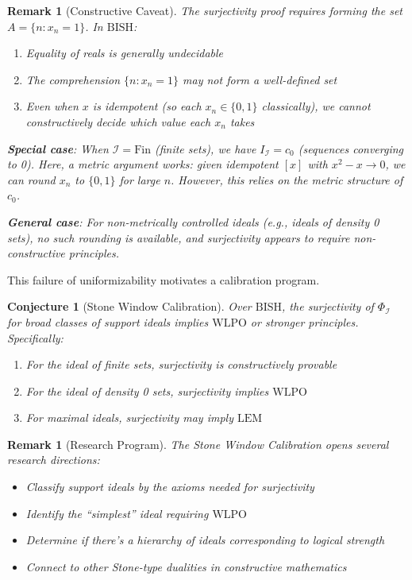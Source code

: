 \documentclass[11pt]{article}
\newtheorem{conjecture}[theorem]{Conjecture}
\newtheorem{remark}[theorem]{Remark}
\newcommand{\WLPO}{\mathrm{WLPO}}
\newcommand{\LEM}{\mathrm{LEM}}
\newcommand{\BISH}{\mathrm{BISH}}
\begin{document}
\begin{remark}[Constructive Caveat]\label{rem:constructive-caveat}
The surjectivity proof requires forming the set $A = \{n : x_n = 1\}$. In $\BISH$:
\begin{enumerate}
\item Equality of reals is generally undecidable
\item The comprehension $\{n : x_n = 1\}$ may not form a well-defined set
\item Even when $x$ is idempotent (so each $x_n \in \{0,1\}$ classically), we cannot constructively decide which value each $x_n$ takes
\end{enumerate}

\textbf{Special case}: When $\mathcal{I} = \text{Fin}$ (finite sets), we have $I_{\mathcal{I}} = c_0$ (sequences converging to 0). Here, a metric argument works: given idempotent $[x]$ with $x^2 - x \to 0$, we can round $x_n$ to $\{0,1\}$ for large $n$. However, this relies on the metric structure of $c_0$.

\textbf{General case}: For non-metrically controlled ideals (e.g., ideals of density 0 sets), no such rounding is available, and surjectivity appears to require non-constructive principles.
\end{remark}

This failure of uniformizability motivates a calibration program.

\begin{conjecture}[Stone Window Calibration]\label{conj:stone-calibration}
Over $\BISH$, the surjectivity of $\Phi_{\mathcal{I}}$ for broad classes of support ideals implies $\WLPO$ or stronger principles. Specifically:
\begin{enumerate}
\item For the ideal of finite sets, surjectivity is constructively provable
\item For the ideal of density 0 sets, surjectivity implies $\WLPO$
\item For maximal ideals, surjectivity may imply $\LEM$
\end{enumerate}
\end{conjecture}

\begin{remark}[Research Program]
The Stone Window Calibration opens several research directions:
\begin{itemize}
\item Classify support ideals by the axioms needed for surjectivity
\item Identify the ``simplest'' ideal requiring $\WLPO$
\item Determine if there's a hierarchy of ideals corresponding to logical strength
\item Connect to other Stone-type dualities in constructive mathematics
\end{itemize}
\end{remark}
\end{document}
